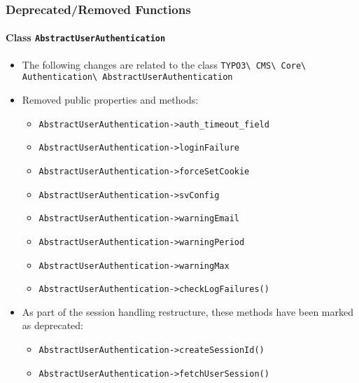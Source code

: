 %

\begin{frame}[fragile]
	\frametitle{Deprecated/Removed Functions}
	\framesubtitle{Class \texttt{AbstractUserAuthentication}}

	\begin{itemize}
		\item The following changes are related to the class\newline
			\small\texttt{TYPO3\textbackslash
				CMS\textbackslash
				Core\textbackslash
				Authentication\textbackslash
				AbstractUserAuthentication}\normalsize

		\item Removed public properties and methods:

			\begin{itemize}\smaller
				\item \texttt{AbstractUserAuthentication->auth\_timeout\_field}
				\item \texttt{AbstractUserAuthentication->loginFailure}
				\item \texttt{AbstractUserAuthentication->forceSetCookie}
				\item \texttt{AbstractUserAuthentication->svConfig}
				\item \texttt{AbstractUserAuthentication->warningEmail}
				\item \texttt{AbstractUserAuthentication->warningPeriod}
				\item \texttt{AbstractUserAuthentication->warningMax}
				\item \texttt{AbstractUserAuthentication->checkLogFailures()}
			\end{itemize}\normalsize

		\item As part of the session handling restructure, these methods have been marked as deprecated:

			\begin{itemize}\smaller
				\item \texttt{AbstractUserAuthentication->createSessionId()}
				\item \texttt{AbstractUserAuthentication->fetchUserSession()}
			\end{itemize}\normalsize


	\end{itemize}

\end{frame}

